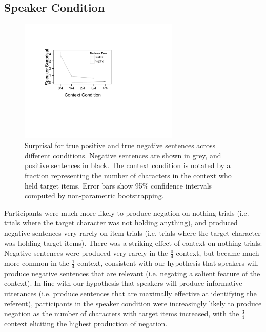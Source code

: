 \documentclass[man, noapacite]{apa2}
\begin{document}
\subsection{Speaker Condition}

\begin{figure}[t]
\begin{center} 
\includegraphics[width=3in]{figures/surprisals.pdf}
\caption{\label{fig:speakersurprise} Surprisal for true positive and true negative sentences across different conditions. Negative sentences are shown in grey, and positive sentences in black.  The context condition is notated by a fraction representing the number of characters in the context who held target items. Error bars show 95\% confidence intervals computed by non-parametric bootstrapping.  }
\end{center} 
\end{figure}

Participants were much more likely to produce negation on nothing trials (i.e. trials where the target character was not holding anything), and produced negative sentences very rarely on item trials (i.e. trials where the target character was holding target items).   There was a striking effect of context on nothing trials: Negative sentences were produced very rarely in  the $\frac{0}{4}$ context, but became much more common in the $\frac{1}{4}$ context, consistent with our hypothesis that speakers will produce negative sentences that are relevant (i.e. negating a salient feature of the context).  In line with our hypothesis that speakers will produce informative utterances (i.e. produce sentences that are maximally effective at identifying the referent), participants in the speaker condition were increasingly likely to produce negation as the number of characters with target items increased, with the  $\frac{3}{4}$ context eliciting the highest production of negation.  
\end{document}
